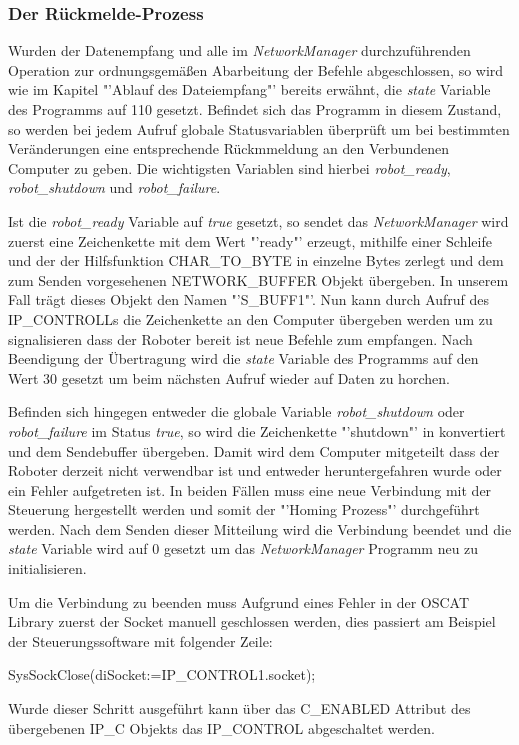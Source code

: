 \subsubsection{Der Rückmelde-Prozess}
Wurden der Datenempfang und alle im \textit{NetworkManager} durchzuführenden Operation zur ordnungsgemäßen Abarbeitung der Befehle abgeschlossen, so wird wie im Kapitel "'Ablauf des Dateiempfang"' bereits erwähnt, die \textit{state} Variable des Programms auf 110 gesetzt. Befindet sich das Programm in diesem Zustand, so werden bei jedem Aufruf globale Statusvariablen überprüft um bei bestimmten Veränderungen eine entsprechende Rückmmeldung an den Verbundenen Computer zu geben. Die wichtigsten Variablen sind hierbei \textit{robot\_ready}, \textit{robot\_shutdown} und \textit{robot\_failure}.

Ist die \textit{robot\_ready} Variable auf \textit{true} gesetzt, so sendet das \textit{NetworkManager} wird zuerst eine Zeichenkette mit dem Wert "'ready"' erzeugt, mithilfe einer Schleife und der der Hilfsfunktion CHAR\_TO\_BYTE in einzelne Bytes zerlegt und dem zum Senden vorgesehenen NETWORK\_BUFFER Objekt übergeben. In unserem Fall trägt dieses Objekt den Namen "'S\_BUFF1"'. Nun kann durch Aufruf des IP\_CONTROLLs die Zeichenkette an den Computer übergeben werden um zu signalisieren dass der Roboter bereit ist neue Befehle zum empfangen. Nach Beendigung der Übertragung wird die \textit{state} Variable des Programms auf den Wert 30 gesetzt um beim nächsten Aufruf wieder auf Daten zu horchen.

Befinden sich hingegen entweder die globale Variable \textit{robot\_shutdown} oder \textit{robot\_failure} im Status \textit{true}, so wird die Zeichenkette "'shutdown"' in konvertiert und dem Sendebuffer übergeben. Damit wird dem Computer mitgeteilt dass der Roboter derzeit nicht verwendbar ist und entweder heruntergefahren wurde oder ein Fehler aufgetreten ist. In beiden Fällen muss eine neue Verbindung mit der Steuerung hergestellt werden und somit der "'Homing Prozess"' durchgeführt werden. Nach dem Senden dieser Mitteilung wird die Verbindung beendet und die \textit{state} Variable wird auf 0 gesetzt um das \textit{NetworkManager} Programm neu zu initialisieren. 

Um die Verbindung zu beenden muss Aufgrund eines Fehler in der OSCAT Library zuerst der Socket manuell geschlossen werden, dies passiert am Beispiel der Steuerungssoftware mit folgender Zeile:

SysSockClose(diSocket:=IP\_CONTROL1.socket);

Wurde dieser Schritt ausgeführt kann über das C\_ENABLED Attribut des übergebenen IP\_C Objekts das IP\_CONTROL abgeschaltet werden.


